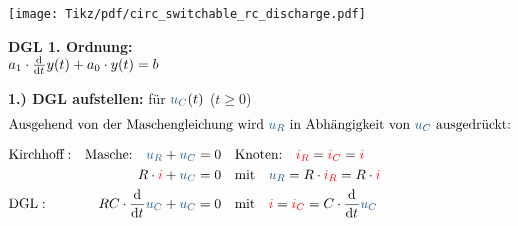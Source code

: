 {\begin{frame}[t]
\begin{minipage}{\textwidth}\centering
\begin{minipage}[t][][t]{0.48\textwidth}\centering\vspace{0cm}
    \texttt{[image: Tikz/pdf/circ\_switchable\_rc\_discharge.pdf]}%
\end{minipage}
\begin{minipage}[t][][t]{0.48\textwidth}\centering\vspace{0cm}
    \vspace{0.8cm}
    \textbf{DGL 1. Ordnung:}\\[0.85em]
    $a_1 \cdot \frac{\mathrm{d}^{{}}}{\mathrm{d}t^{{}}} y(t) + a_0 \cdot y(t)=b$\\
\end{minipage}
\end{minipage}%
\vspace{0.75cm}

\textbf{1.) DGL aufstellen:} für $\ecv{u_C}(t)$ ($t\geq 0$)\\[-1em]
\begin{align*}
\intertext{Ausgehend von der Maschengleichung wird $\ecv{u_R}$ in Abhängigkeit von $\ecv{u_C}$ ausgedrückt:}\\[-1em]
&\text{Kirchhoff}:
&\text{Masche:}\quad\ecv{u_R} + \ecv{u_C}  &= 0
&&\text{Knoten:}\quad{\color{red} i_R} = {\color{red} i_C} = {\color{red} i}\\
&&
    R \cdot {\color{red} i} + \ecv{u_C}    &= 0
        &&\text{mit}\quad
        \ecv{u_R} = R \cdot \eci{i_R} = R \cdot \eci{i}\\
&\text{DGL}:&
    RC \cdot \dt \ecv{u_C}  + \ecv{u_C}   &= 0
        &&\text{mit}\quad
        \eci{i} = \eci{i_C} = C \cdot \dt \ecv{u_C}
\end{align*}
\end{frame}


}
